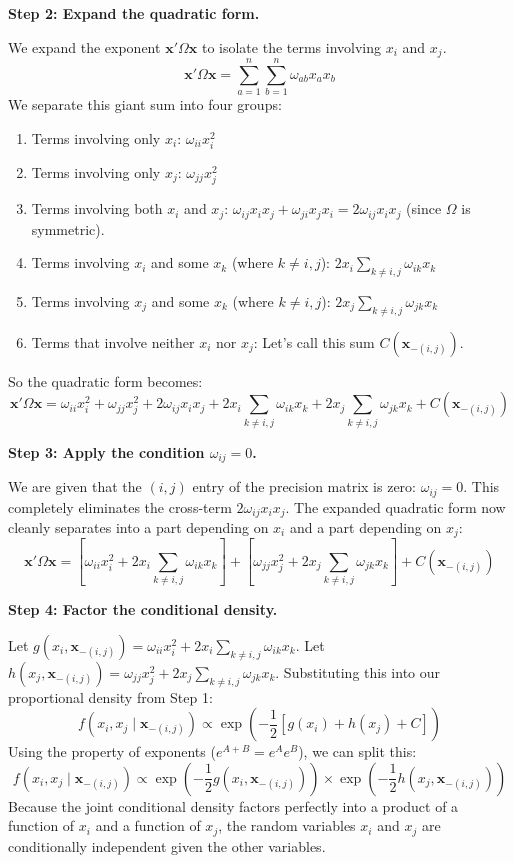 \begin{solution}
\textbf{Step 2: Expand the quadratic form.}

We expand the exponent $\mathbf{x}' \Omega \mathbf{x}$ to isolate the terms involving $x_i$ and $x_j$.
\[ \mathbf{x}' \Omega \mathbf{x} = \sum_{a=1}^n \sum_{b=1}^n \omega_{ab} x_a x_b \]
We separate this giant sum into four groups:
\begin{enumerate}
    \item Terms involving only $x_i$: $\omega_{ii} x_i^2$
    \item Terms involving only $x_j$: $\omega_{jj} x_j^2$
    \item Terms involving both $x_i$ and $x_j$: $\omega_{ij} x_i x_j + \omega_{ji} x_j x_i = 2\omega_{ij} x_i x_j$ (since $\Omega$ is symmetric).
    \item Terms involving $x_i$ and some $x_k$ (where $k \neq i, j$): $2x_i \sum_{k \neq i,j} \omega_{ik} x_k$
    \item Terms involving $x_j$ and some $x_k$ (where $k \neq i, j$): $2x_j \sum_{k \neq i,j} \omega_{jk} x_k$
    \item Terms that involve neither $x_i$ nor $x_j$: Let's call this sum $C(\mathbf{x}_{-(i,j)})$.
\end{enumerate}

So the quadratic form becomes:
\[ \mathbf{x}' \Omega \mathbf{x} = \omega_{ii} x_i^2 + \omega_{jj} x_j^2 + 2\omega_{ij} x_i x_j + 2x_i \sum_{k \neq i,j} \omega_{ik} x_k + 2x_j \sum_{k \neq i,j} \omega_{jk} x_k + C(\mathbf{x}_{-(i,j)}) \]

\textbf{Step 3: Apply the condition $\omega_{ij} = 0$.}

We are given that the $(i,j)$ entry of the precision matrix is zero: $\omega_{ij} = 0$.
This completely eliminates the cross-term $2\omega_{ij} x_i x_j$.
The expanded quadratic form now cleanly separates into a part depending on $x_i$ and a part depending on $x_j$:
\[ \mathbf{x}' \Omega \mathbf{x} = \left[ \omega_{ii} x_i^2 + 2x_i \sum_{k \neq i,j} \omega_{ik} x_k \right] + \left[ \omega_{jj} x_j^2 + 2x_j \sum_{k \neq i,j} \omega_{jk} x_k \right] + C(\mathbf{x}_{-(i,j)}) \]

\textbf{Step 4: Factor the conditional density.}

Let $g(x_i, \mathbf{x}_{-(i,j)}) = \omega_{ii} x_i^2 + 2x_i \sum_{k \neq i,j} \omega_{ik} x_k$.
Let $h(x_j, \mathbf{x}_{-(i,j)}) = \omega_{jj} x_j^2 + 2x_j \sum_{k \neq i,j} \omega_{jk} x_k$.
Substituting this into our proportional density from Step 1:
\[ f(x_i, x_j \mid \mathbf{x}_{-(i,j)}) \propto \exp\left( -\frac{1}{2} [g(x_i) + h(x_j) + C] \right) \]
Using the property of exponents ($e^{A+B} = e^A e^B$), we can split this:
\[ f(x_i, x_j \mid \mathbf{x}_{-(i,j)}) \propto \exp\left( -\frac{1}{2} g(x_i, \mathbf{x}_{-(i,j)}) \right) \times \exp\left( -\frac{1}{2} h(x_j, \mathbf{x}_{-(i,j)}) \right) \]
Because the joint conditional density factors perfectly into a product of a function of $x_i$ and a function of $x_j$, the random variables $x_i$ and $x_j$ are conditionally independent given the other variables.
\end{solution}

